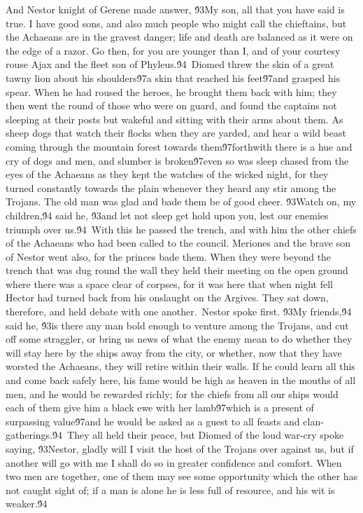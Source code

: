 {And Nestor knight of Gerene made answer, \'93My son, all that you have said is true. I have good sons, and also much people who might call the chieftains, but the Achaeans are in the gravest danger; life and death are balanced as it were on the edge of a razor. Go then, for you are younger than I, and of your courtesy rouse Ajax and the fleet son of Phyleus.\'94\
Diomed threw the skin of a great tawny lion about his shoulders\'97a skin that reached his feet\'97and grasped his spear. When he had roused the heroes, he brought them back with him; they then went the round of those who were on guard, and found the captains not sleeping at their posts but wakeful and sitting with their arms about them. As sheep dogs that watch their flocks when they are yarded, and hear a wild beast coming through the mountain forest towards them\'97forthwith there is a hue and cry of dogs and men, and slumber is broken\'97even so was sleep chased from the eyes of the Achaeans as they kept the watches of the wicked night, for they turned constantly towards the plain whenever they heard any stir among the Trojans. The old man was glad and bade them be of good cheer. \'93Watch on, my children,\'94 said he, \'93and let not sleep get hold upon you, lest our enemies triumph over us.\'94\
With this he passed the trench, and with him the other chiefs of the Achaeans who had been called to the council. Meriones and the brave son of Nestor went also, for the princes bade them. When they were beyond the trench that was dug round the wall they held their meeting on the open ground where there was a space clear of corpses, for it was here that when night fell Hector had turned back from his onslaught on the Argives. They sat down, therefore, and held debate with one another.\
Nestor spoke first. \'93My friends,\'94 said he, \'93is there any man bold enough to venture among the Trojans, and cut off some straggler, or bring us news of what the enemy mean to do whether they will stay here by the ships away from the city, or whether, now that they have worsted the Achaeans, they will retire within their walls. If he could learn all this and come back safely here, his fame would be high as heaven in the mouths of all men, and he would be rewarded richly; for the chiefs from all our ships would each of them give him a black ewe with her lamb\'97which is a present of surpassing value\'97and he would be asked as a guest to all feasts and clan-gatherings.\'94\
They all held their peace, but Diomed of the loud war-cry spoke saying, \'93Nestor, gladly will I visit the host of the Trojans over against us, but if another will go with me I shall do so in greater confidence and comfort. When two men are together, one of them may see some opportunity which the other has not caught sight of; if a man is alone he is less full of resource, and his wit is weaker.\'94\
}
